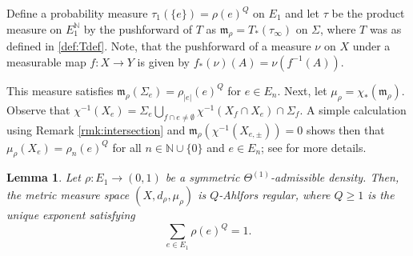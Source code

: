 \documentclass{amsart}
\newtheorem{lemma}[equation]{Lemma}
\numberwithin{equation}{section}
\theoremstyle{definition}
\theoremstyle{remark}
\newcommand{\N}{\mathbb{N}}
\begin{document}
        Define a probability measure $\tau_1(\{e\})=\rho(e)^Q$ on $E_1$ and let $\tau$ be the product measure on $E_1^\N$ by the pushforward of $T$ as $\mathfrak{m}_{\rho}= T_*(\tau_\infty)$ on $\Sigma$, where $T$ was as defined in \ref{def:Tdef}. Note, that the pushforward of a measure $\nu$ on $X$ under a measurable map $f:X\to Y$ is given by $f_*(\nu)(A)=\nu(f^{-1}(A))$. 

    This measure satisfies  \(\mathfrak{m}_{\rho}(\Sigma_e)=\rho_{\lvert e \rvert }(e)^Q\) for $e\in E_n$. Next, let $\mu_\rho=\chi_*(\mathfrak{m}_{\rho})$. Observe that $\chi^{-1}(X_e)=\Sigma_e \bigcup_{f\cap e \neq \emptyset} \chi^{-1}(X_f\cap X_e)\cap \Sigma_f$. A simple calculation using Remark \ref{rmk:intersection} and $\mathfrak{m}_{\rho}(\chi^{-1}(X_{e,\pm}))=0$ shows then that $\mu_\rho(X_e) = \rho_n(e)^Q$ for all $n \in \N \cup \{0\}$ and $e \in E_n$; see \cite[Proposition 3.42]{ASEBShimizu} for more details.
    



\begin{lemma}\label{Lemma: Ahlfors Regular}
Let \(\rho\colon E_1\to(0,1)\) be a symmetric \(\Theta^{(1)}\)-admissible density. Then, the metric measure space \((X, d_\rho, \mu_\rho)\) is \(Q\)-Ahlfors regular, where \(Q\geq 1\) is the unique exponent satisfying
\[
\sum_{e\in E_1} \rho(e)^Q = 1.
\]
\end{lemma}
\end{document}
